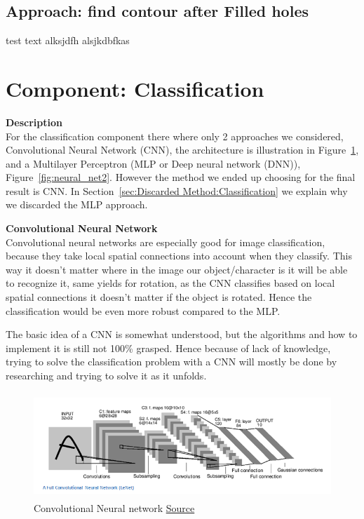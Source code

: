\documentclass[Report.tex]{subfiles}
\begin{document}
\subsection{Approach: find contour after Filled holes}
test text alksjdfh alsjkdbfkas


\section{Component: Classification}
\label{Method:Classification}
\begin{flushleft}
  \textbf{Description} \\
  For the classification component there where only 2 approaches we considered,
  Convolutional Neural Network (CNN), the architecture is illustration in
  Figure~\ref{fig:CNN_architecture}, and a Multilayer Perceptron (MLP or Deep
  neural network (DNN)), Figure~\ref{fig:neural_net2}. However the method we
  ended up choosing for the final result is CNN. In
  Section~\ref{sec:Discarded Method:Classification} we explain why we discarded
  the MLP approach. \par
\end{flushleft}

\begin{flushleft}
  \textbf{Convolutional Neural Network} \\
  Convolutional neural networks are especially good for image
  classification, because they take local spatial connections into account when
  they classify. This way it doesn't matter where in the image our
  object/character is it will be able to recognize it, same yields for rotation,
  as the CNN classifies based on local spatial connections it doesn't matter if
  the object is rotated. Hence the classification would be even more robust
  compared to the MLP. \par
  The basic idea of a CNN is somewhat understood, but the algorithms and how to
  implement it is still not 100\% grasped. Hence because of lack of knowledge,
  trying to solve the classification problem with a CNN will mostly be done
  by researching and trying to solve it as it unfolds.
\end{flushleft}

\begin{figure}[H]
  \centering
  \includegraphics[height=4cm]{res/LeNet.png}
  \caption{Convolutional Neural network \href{https://adeshpande3.github.io/A-Beginner\%27s-Guide-To-Understanding-Convolutional-Neural-Networks/}{Source}}
  \label{fig:CNN_architecture}
\end{figure}
\end{document}
